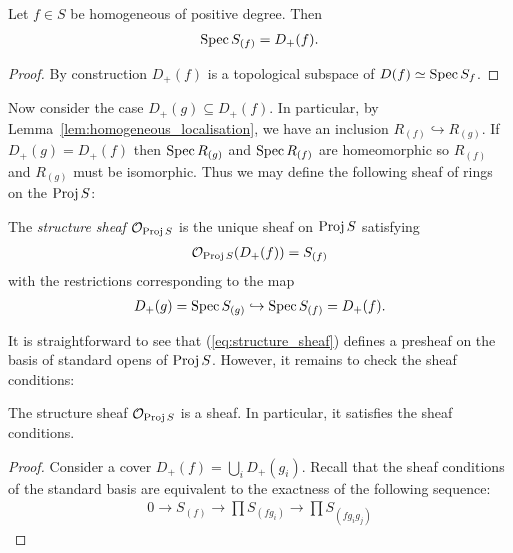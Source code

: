 \documentclass{article}
\begin{document}
\begin{lemma}\label{lem:homogeneous_localisation}
  Let $f\in S$ be homogeneous of positive degree. Then
  \begin{align*}
    \operatorname{Spec} S_{(f)} = D_+(f).
  \end{align*}
  \begin{proof}
    By construction $D_+(f)$ is a topological subspace of
    $D(f)\simeq\operatorname{Spec} S_f$.
    \missingproof
  \end{proof}
\end{lemma}


Now consider the case $D_+(g)\subseteq D_+(f)$. In particular,
by Lemma~\ref{lem:homogeneous_localisation}, we have an inclusion
$R_{(f)}\hookrightarrow R_{(g)}$. If $D_+(g)=D_+(f)$ then
$\operatorname{Spec} R_{(g)}$ and $\operatorname{Spec} R_{(f)}$ are homeomorphic so
$R_{(f)}$ and $R_{(g)}$ must be isomorphic.
Thus we may define the following sheaf of rings on the $\operatorname{Proj} S$:

\begin{definition}
  The \emph{structure sheaf} $\mathcal O_{\operatorname{Proj} S}$ is the unique sheaf
  on $\operatorname{Proj} S$ satisfying
  \begin{align}\label{eq:structure_sheaf}
    \mathcal O_{\operatorname{Proj} S}(D_+(f)) = S_{(f)}
  \end{align}
  with the restrictions corresponding to the map
  \begin{align*}
    D_+(g) = \operatorname{Spec} S_{(g)} \hookrightarrow \operatorname{Spec} S_{(f)} = D_+(f).
  \end{align*}
\end{definition}

It is straightforward to see that (\ref{eq:structure_sheaf})
defines a presheaf on the basis of standard opens of $\operatorname{Proj} S$.
However, it remains to check the sheaf conditions:

\begin{proposition}
  The structure sheaf $\mathcal O_{\operatorname{Proj} S}$ is a sheaf.
  In particular, it satisfies the sheaf conditions.
  \begin{proof}
    Consider a cover $D_+(f) = \bigcup_i D_+(g_i)$. Recall that the
    sheaf conditions of the standard basis are equivalent to the
    exactness of the following sequence:
    \begin{align*}
      0 \longrightarrow
      S_{(f)} \longrightarrow
      \prod S_{(fg_i)} \longrightarrow
      \prod S_{(fg_ig_j)}
    \end{align*}
    \missingproof
  \end{proof}
\end{proposition}
\end{document}
